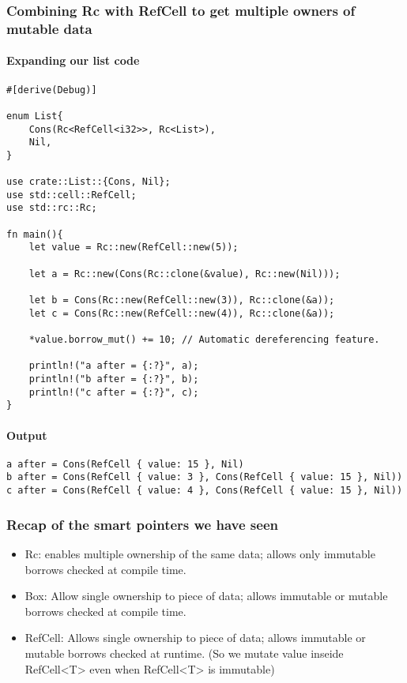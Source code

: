 \subsubsection{Combining Rc with RefCell to get multiple owners of mutable data}
\paragraph*{Expanding our list code}\begin{lstlisting}
#[derive(Debug)]

enum List{
    Cons(Rc<RefCell<i32>>, Rc<List>),
    Nil,
}

use crate::List::{Cons, Nil};
use std::cell::RefCell;
use std::rc::Rc;

fn main(){
    let value = Rc::new(RefCell::new(5));

    let a = Rc::new(Cons(Rc::clone(&value), Rc::new(Nil)));

    let b = Cons(Rc::new(RefCell::new(3)), Rc::clone(&a));
    let c = Cons(Rc::new(RefCell::new(4)), Rc::clone(&a));

    *value.borrow_mut() += 10; // Automatic dereferencing feature.

    println!("a after = {:?}", a);
    println!("b after = {:?}", b);
    println!("c after = {:?}", c);
}
\end{lstlisting}

\paragraph*{Output}\begin{lstlisting}
a after = Cons(RefCell { value: 15 }, Nil)
b after = Cons(RefCell { value: 3 }, Cons(RefCell { value: 15 }, Nil))
c after = Cons(RefCell { value: 4 }, Cons(RefCell { value: 15 }, Nil))
\end{lstlisting}

\subsubsection{Recap of the smart pointers we have seen}
\begin{itemize}
    \item Rc: enables multiple ownership of the same data; allows only immutable borrows checked at compile time.
    \item Box: Allow single ownership to piece of data; allows immutable or mutable borrows checked at compile time.
    \item RefCell: Allows single ownership to piece of data; allows immutable or mutable borrows checked at runtime. (So we mutate value inseide RefCell<T> even when RefCell<T> is immutable)
\end{itemize}

